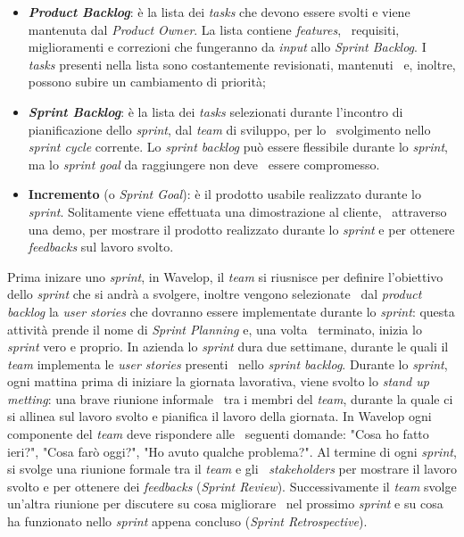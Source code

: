 \begin{itemize}
  \item \textbf{\emph{Product Backlog}}: è la lista dei \emph{tasks} che devono essere svolti e viene mantenuta dal \emph{Product Owner}. La lista contiene \emph{features}, \
  requisiti, miglioramenti e correzioni che fungeranno da \emph{input} allo \emph{Sprint Backlog}. I \emph{tasks} presenti nella lista sono costantemente revisionati, mantenuti \
  e, inoltre, possono subire un cambiamento di priorità; 
  \item \textbf{\emph{Sprint Backlog}}: è la lista dei \emph{tasks} selezionati durante l'incontro di pianificazione dello \emph{sprint}, dal \emph{team} di sviluppo, per lo \
  svolgimento nello \emph{sprint cycle} corrente. Lo \emph{sprint backlog} può essere flessibile durante lo \emph{sprint}, ma lo \emph{sprint goal} da raggiungere non deve \
  essere compromesso.
  \item \textbf{Incremento} (o \emph{Sprint Goal}): è il prodotto usabile realizzato durante lo \emph{sprint}. Solitamente viene effettuata una dimostrazione al cliente, \
  attraverso una demo, per mostrare il prodotto realizzato durante lo \emph{sprint} e per ottenere \emph{feedbacks} sul lavoro svolto.
\end{itemize}

Prima inizare uno \emph{sprint}, in Wavelop, il \emph{team} si riusnisce per definire l'obiettivo dello \emph{sprint} che si andrà a svolgere, inoltre vengono selezionate \
dal \emph{product backlog} la \emph{user stories} che dovranno essere implementate durante lo \emph{sprint}: questa attività prende il nome di \emph{Sprint Planning} e, una volta \
terminato, inizia lo \emph{sprint} vero e proprio. In azienda lo \emph{sprint} dura due settimane, durante le quali il \emph{team} implementa le \emph{user stories} presenti \
nello \emph{sprint backlog}. Durante lo \emph{sprint}, ogni mattina prima di iniziare la giornata lavorativa, viene svolto lo \emph{stand up metting}: una brave riunione informale \
tra i membri del \emph{team}, durante la quale ci si allinea sul lavoro svolto e pianifica il lavoro della giornata. In Wavelop ogni componente del \emph{team} deve rispondere alle \
seguenti domande: "Cosa ho fatto ieri?", "Cosa farò oggi?", "Ho avuto qualche problema?". Al termine di ogni \emph{sprint}, si svolge una riunione formale tra il \emph{team} e gli \
\emph{\glspl{stakeholder}} per mostrare il lavoro svolto e per ottenere dei \emph{feedbacks} (\emph{Sprint Review}). Successivamente il \emph{team} svolge un'altra riunione per discutere su cosa migliorare \
nel prossimo \emph{sprint} e su cosa ha funzionato nello \emph{sprint} appena concluso (\emph{Sprint Retrospective}). 

